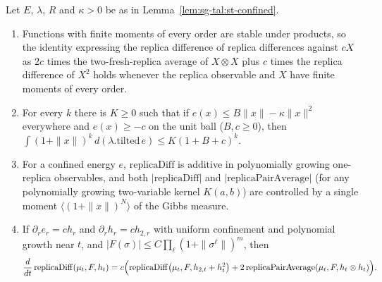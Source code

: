 \begin{lemma}\label{lem:sg-tal:st-replica-second}
  \leanok
Let $E$, $\lambda$, $R$ and $\kappa>0$ be as in Lemma~\ref{lem:sg-tal:st-confined}.
\begin{enumerate}
\item Functions with finite moments of every order are stable under products, so the identity expressing the
replica difference of replica differences against $cX$ as $2c$ times the two-fresh-replica average of $X\otimes X$
plus $c$ times the replica difference of $X^2$ holds whenever the replica observable and $X$ have finite moments of
every order.
\item For every $k$ there is $K\ge0$ such that if $e(x)\le B\|x\|-\kappa\|x\|^2$ everywhere and $e(x)\ge-c$ on the
unit ball ($B,c\ge0$), then $\int(1+\|x\|)^k\,d(\lambda.\mathrm{tilted}\,e)\le K(1+B+c)^k$.
\item For a confined energy $e$, $\mathrm{replicaDiff}$ is additive in polynomially growing one-replica observables,
and both $|\mathrm{replicaDiff}|$ and $|\mathrm{replicaPairAverage}|$ (for any polynomially growing two-variable
kernel $K(a,b)$) are controlled by a single moment $\langle(1+\|x\|)^N\rangle$ of the Gibbs measure.
\item If $\partial_r e_r=ch_r$ and $\partial_r h_r=ch_{2,r}$ with uniform confinement and polynomial growth near
$t$, and $|F(\sigma)|\le C\prod_\ell(1+\|\sigma^\ell\|)^m$, then
\[
\frac d{dt}\,\mathrm{replicaDiff}(\mu_t,F,h_t)
=c\Bigl(\mathrm{replicaDiff}\bigl(\mu_t,F,h_{2,t}+h_t^2\bigr)
+2\,\mathrm{replicaPairAverage}(\mu_t,F,h_t\otimes h_t)\Bigr).
\]
\end{enumerate}
\end{lemma}
